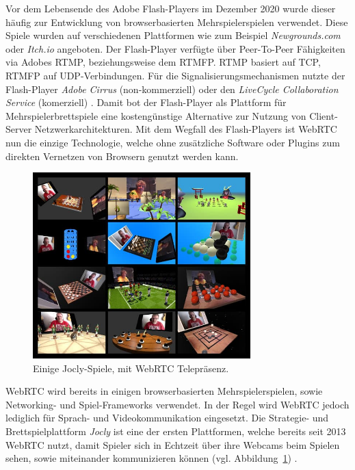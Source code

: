 Vor dem Lebensende des Adobe Flash-Players im Dezember 2020 wurde dieser häufig zur Entwicklung von browserbasierten Mehrspielerspielen verwendet. Diese Spiele wurden auf verschiedenen Plattformen wie zum Beispiel \textit{Newgrounds.com} oder \textit{Itch.io} angeboten. Der Flash-Player verfügte über Peer-To-Peer Fähigkeiten via Adobes \acf{RTMP}, beziehungsweise dem \acf{RTMFP}. \acs{RTMP} basiert auf \acs{TCP}, \acs{RTMFP} auf \acs{UDP}-Verbindungen. Für die Signalisierungsmechanismen nutzte der Flash-Player \textit{Adobe Cirrus} (non-kommerziell) oder den \textit{LiveCycle Collaboration Service} (komerziell) \cite{adobep2p}. Damit bot der Flash-Player als Plattform für Mehrspielerbrettspiele eine kostengünstige Alternative zur Nutzung von Client-Server Netzwerkarchitekturen. Mit dem Wegfall des Flash-Players ist WebRTC nun die einzige Technologie, welche ohne zusätzliche Software oder Plugins zum direkten Vernetzen von Browsern genutzt werden kann.

\begin{figure}[h]
\centering
\includegraphics[width=0.75\textwidth]{bilder/jocly-games.jpg}
\caption{Einige Jocly-Spiele, mit WebRTC Telepräsenz.}
\label{fig:jocly}
\end{figure}

\acs{WebRTC} wird bereits in einigen browserbasierten Mehrspielerspielen, sowie Networking- und Spiel-Frameworks verwendet. In der Regel wird WebRTC jedoch lediglich für Sprach- und Videokommunikation eingesetzt. Die Strategie- und Brettspielplattform \textit{Jocly} ist eine der ersten Plattformen, welche bereits seit 2013 \acs{WebRTC} nutzt, damit Spieler sich in Echtzeit über ihre Webcams beim Spielen sehen, sowie miteinander kommunizieren können (vgl. Abbildung~\ref{fig:jocly}) \cite{jocly2013}.

